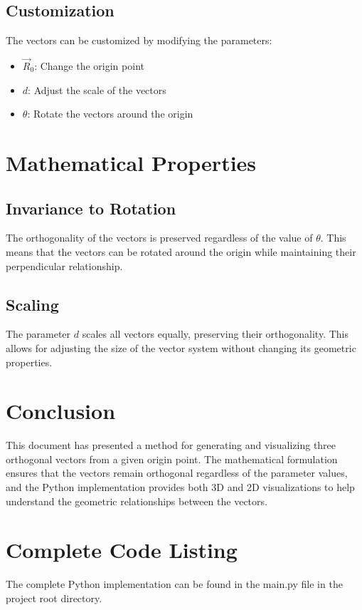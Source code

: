 \documentclass{article}
\begin{document}
\subsection{Customization}
The vectors can be customized by modifying the parameters:
\begin{itemize}
    \item $\vec{R}_0$: Change the origin point
    \item $d$: Adjust the scale of the vectors
    \item $\theta$: Rotate the vectors around the origin
\end{itemize}

\section{Mathematical Properties}

\subsection{Invariance to Rotation}
The orthogonality of the vectors is preserved regardless of the value of $\theta$. This means that the vectors can be rotated around the origin while maintaining their perpendicular relationship.

\subsection{Scaling}
The parameter $d$ scales all vectors equally, preserving their orthogonality. This allows for adjusting the size of the vector system without changing its geometric properties.

\section{Conclusion}
This document has presented a method for generating and visualizing three orthogonal vectors from a given origin point. The mathematical formulation ensures that the vectors remain orthogonal regardless of the parameter values, and the Python implementation provides both 3D and 2D visualizations to help understand the geometric relationships between the vectors.

\appendix
\section{Complete Code Listing}
The complete Python implementation can be found in the main.py file in the project root directory.
\end{document}

